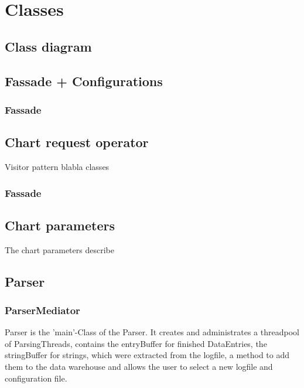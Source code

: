 \section{Classes}

\subsection{Class diagram}

\subsection{Fassade + Configurations}
\subsubsection{Fassade}


\subsection{Chart request operator}
Visitor pattern blabla
classes
\subsubsection{Fassade}

\subsection{Chart parameters}
The chart parameters describe 

\subsection{}


\subsection{Parser}

\subsubsection*{ParserMediator}
Parser is the 'main'-Class of the Parser. It creates and administrates a threadpool of ParsingThreads,
contains the entryBuffer for finished DataEntries, the stringBuffer for strings, which were extracted
from the logfile, a method to add them to the data warehouse
and allows the user to select a new logfile and configuration file. %

